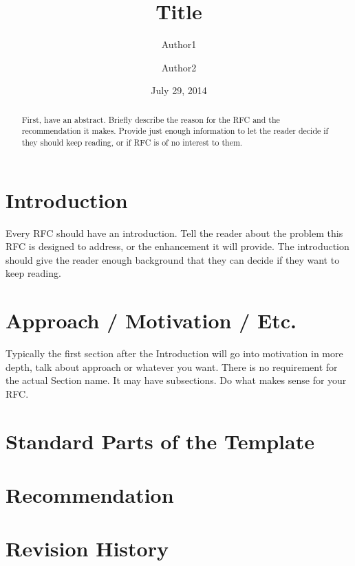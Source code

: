 \documentclass[letterpaper,hyper]{THG_RFC}
\title{Title}
\author{Author1}
\author{Author2}
\date{July 29, 2014}
\begin{document}
\maketitle

\begin{abstract}
First, have an abstract. Briefly describe the reason for the RFC and the recommendation it makes. Provide just enough information to let the reader decide if they should keep reading, or if RFC is of no interest to them.
\end{abstract}

\section{Introduction}
Every RFC should have an introduction. Tell the reader about the problem this RFC is designed to address, or the enhancement it will provide. The introduction should give the reader enough background that they can decide if they want to keep reading.

\section{Approach / Motivation / Etc.}
Typically the first section after the Introduction will go into motivation in more depth, talk about approach or whatever you want. There is no requirement for the actual Section name. It may have subsections. Do what makes sense for your RFC.

\section{Standard Parts of the Template}

\section{Recommendation}

\section*{Revision History}
\makerevisions

%
%
\end{document}
